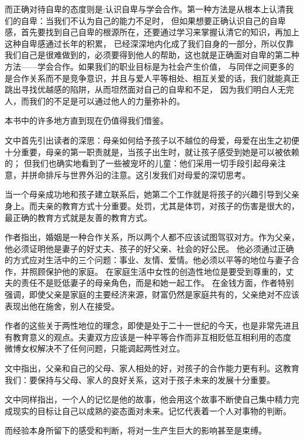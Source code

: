 \documentclass[UTF8]{ctexart}
\begin{document}
    而正确对待自卑的态度则是:认识自卑与学会合作。第一种方法是从根本上认清我们的自卑：当我们不认为自己的能力不足时，
    但如果想要正确认识自己的自卑感，首先要找到自己自卑的根源所在，还要通过学习来掌握认清它的知识，再加上这种自卑感通过长年的积累，
    已经深深地内化成了我们自身的一部分，所以仅靠我们自己是很难做到的，必须要得到他人的帮助，这也就是正确面对自卑的第二种方法——学会合作。如果我们的职业目标是为社会产生价值，
    与同伴之间更多的是合作关系而不是竞争意识，并且与爱人平等相处、相互关爱的话，我们就能真正跳出寻找优越感的陷阱，从而坦然面对自己的自卑和不足，
    因为我们明白人无完人，而我们的不足是可以通过他人的力量弥补的。

    本书中的许多地方直到现在仍值得我们借鉴。

    文中首先引出读者的深思：母亲如何给予孩子以不越位的母爱，母爱在出生之初便十分重要，母亲的第一职责就是，当孩子出生时，就让孩子感受到她是可以被依赖的；
    但我们也确实地看到了一些被宠坏的儿童：他们采用一切手段引起母亲注意，并拼命排斥与世界外沿的注意。这引发我们对母爱的深切思考。

    当一个母亲成功地和孩子建立联系后，她第二个工作就是将孩子的兴趣引导到父亲身上。而夫亲的教育方式十分重要。处罚，尤其是体罚，对孩子的伤害是很大的，最正确的教育方式就是友善的教育方式。

    作者指出，婚姻是一种合作关系，所以两个人都不应该试图驾驭对方。作为父亲，他必须证明他是妻子的好丈夫、孩子的好父亲、社会的好公民。
    他必须通过正确的方式应对生活中的三个问题：事业、友情、爱情。他必须以平等的地位与妻子合作，并照顾保护他的家庭。
    在家庭生活中女性的创造性地位是要受到尊重的，丈夫的责任不是贬低妻子的母亲角色，而是和她一起工作。
    在金钱方面，作者特别强调，即使父亲是家庭的主要经济来源，财富仍然是家庭共有的，父亲绝对不应该表现出他在施舍，别人在接受。
    
    作者的这些关于两性地位的理念，即使是处于二十一世纪的今天，也是非常先进且有教育意义的观点。夫妻双方应该是一种平等合作而非互相贬低互相利用的态度
    微博女权解决不了任何问题，只能调起两性对立。

    文中指出，父亲和自己的父母、家人相处的好，对孩子的合作能力更有利。这教育我们：要保持与父母、家人的良好关系，这对于孩子未来的发展十分重要。

    文中同样指出，一个人的记忆是他的故事，他会用这个故事不断使自己集中精力完成现实的目标让自己以成熟的姿态面对未来。记忆代表着一个人对事物的判断。

    而经验本身所留下的感受和判断，将对一生产生巨大的影响甚至是束缚。
\end{document}
